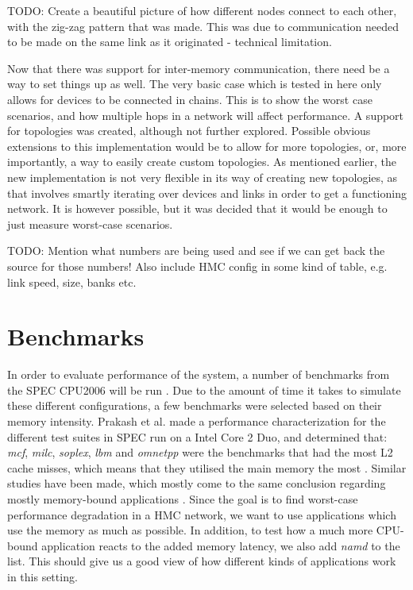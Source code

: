 TODO: Create a beautiful picture of how different nodes connect to each other, with the zig-zag pattern that was made. This was due to communication needed to be made on the same link as it originated - technical limitation.
\bigskip

Now that there was support for inter-memory communication, there need be a way to set things up as well. The very basic case which is tested in here only allows for devices to be connected in chains. This is to show the worst case scenarios, and how multiple hops in a network will affect performance. A support for topologies was created, although not further explored. Possible obvious extensions to this implementation would be to allow for more topologies, or, more importantly, a way to easily create custom topologies. As mentioned earlier, the new implementation is not very flexible in its way of creating new topologies, as that involves smartly iterating over devices and links in order to get a functioning network. It is however possible, but it was decided that it would be enough to just measure worst-case scenarios.
\bigskip

TODO: Mention what numbers are being used and see if we can get back the source for those numbers! Also include HMC config in some kind of table, e.g. link speed, size, banks etc.


\section{Benchmarks}
In order to evaluate performance of the system, a number of benchmarks from the SPEC CPU2006 will be run \cite{henning2006spec}. Due to the amount of time it takes to simulate these different configurations, a few benchmarks were selected based on their memory intensity. Prakash et al. made a performance characterization for the different test suites in SPEC run on a Intel Core 2 Duo, and determined that: \emph{mcf}, \emph{milc}, \emph{soplex}, \emph{lbm} and \emph{omnetpp} were the benchmarks that had the most L2 cache misses, which means that they utilised the main memory the most \cite{prakash2008performance}. Similar studies have been made, which mostly come to the same conclusion regarding mostly memory-bound applications \cite{4664856} \cite{4086140} \cite{bird2007performance}. Since the goal is to find worst-case performance degradation in a HMC network, we want to use applications which use the memory as much as possible. In addition, to test how a much more CPU-bound application reacts to the added memory latency, we also add \emph{namd} to the list. This should give us a good view of how different kinds of applications work in this setting. 
\bigskip

